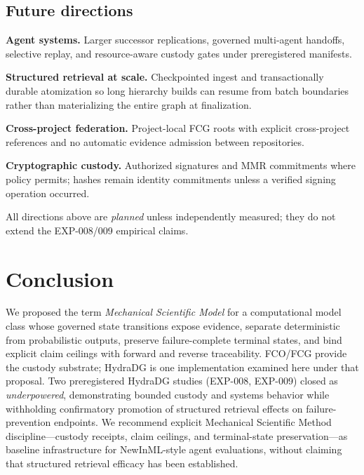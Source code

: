 \documentclass{article}
\begin{document}
\subsection{Future directions}

\textbf{Agent systems.} Larger successor replications, governed multi-agent handoffs, selective replay, and resource-aware custody gates under preregistered manifests.

\textbf{Structured retrieval at scale.} Checkpointed ingest and transactionally durable atomization so long hierarchy builds can resume from batch boundaries rather than materializing the entire graph at finalization.

\textbf{Cross-project federation.} Project-local FCG roots with explicit cross-project references and no automatic evidence admission between repositories.

\textbf{Cryptographic custody.} Authorized signatures and MMR commitments where policy permits; hashes remain identity commitments unless a verified signing operation occurred.

All directions above are \emph{planned} unless independently measured; they do not extend the EXP-008/009 empirical claims.

\section{Conclusion}

We proposed the term \emph{Mechanical Scientific Model} for a computational model class whose governed state transitions expose evidence, separate deterministic from probabilistic outputs, preserve failure-complete terminal states, and bind explicit claim ceilings with forward and reverse traceability.
FCO/FCG provide the custody substrate; HydraDG is one implementation examined here under that proposal.
Two preregistered HydraDG studies (EXP-008, EXP-009) closed as \emph{underpowered}, demonstrating bounded custody and systems behavior while withholding confirmatory promotion of structured retrieval effects on failure-prevention endpoints.
We recommend explicit Mechanical Scientific Method discipline---custody receipts, claim ceilings, and terminal-state preservation---as baseline infrastructure for NewInML-style agent evaluations, without claiming that structured retrieval efficacy has been established.
\end{document}
